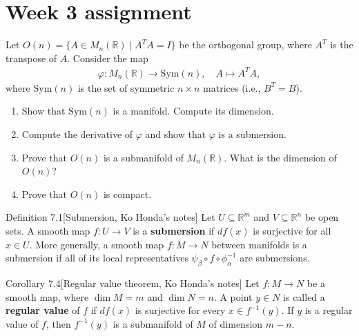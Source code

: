 \section*{Week 3 assignment}


Let $O(n)=\{A\in M_n(\mathbb{R}) \mid A^TA=I\}$ be the orthogonal group, where $A^T$ is the transpose of $A$. Consider the map
\begin{align}
    \varphi: M_n(\mathbb{R})\to \mathrm{Sym}(n),\quad A\mapsto A^TA,
\end{align}
where $\mathrm{Sym}(n)$ is the set of symmetric $n\times n$ matrices (i.e., $B^T=B$).
\begin{enumerate}
    \item Show that $\mathrm{Sym}(n)$ is a manifold. Compute its dimension.
    \item Compute the derivative of $\varphi$ and show that $\varphi$ is a submersion.
    \item Prove that $O(n)$ is a submanifold of $M_n(\mathbb{R})$. What is the dimension of $O(n)$?
    \item Prove that $O(n)$ is compact.
\end{enumerate}
\answer{}

\begin{namedthm}{Definition 7.1}[Submersion, Ko Honda's notes]
Let $U\subseteq\mathbb{R}^m$ and $V\subseteq\mathbb{R}^n$ be open sets. A smooth map $f:U\to V$ is a \textbf{submersion} if $df(x)$ is surjective for all $x\in U$. More generally, a smooth map $f:M\to N$ between manifolds is a submersion if all of its local representatives $\psi_\beta\circ f\circ\phi_\alpha^{-1}$ are submersions.
\end{namedthm}

\begin{namedthm}{Corollary 7.4}[Regular value theorem, Ko Honda's notes]
Let $f: M\to N$ be a smooth map, where $\dim M = m$ and $\dim N = n$. A point $y\in N$ is called a \textbf{regular value} of $f$ if $df(x)$ is surjective for every $x\in f^{-1}(y)$. If $y$ is a regular value of $f$, then $f^{-1}(y)$ is a submanifold of $M$ of dimension $m-n$.
\end{namedthm}




